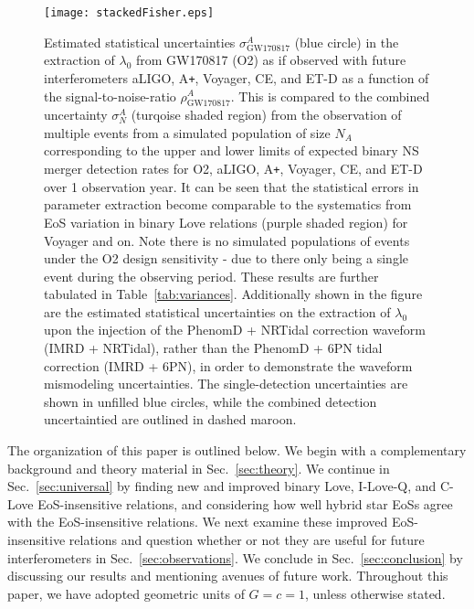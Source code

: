 \documentclass[prd,twocolumn,nofootinbib,superscriptaddress,amsmath,amssymb]{revtex4-1}
\begin{document}
\begin{figure}
\begin{center} 
\texttt{[image: stackedFisher.eps]}
\end{center}
\caption{
Estimated statistical uncertainties $\sigma^A_{\text{GW170817}}$ (blue circle) in the extraction of $\lambda_0$ from GW170817 (O2) as if observed with future interferometers aLIGO, A\texttt{+}, Voyager, CE, and ET-D as a function of the signal-to-noise-ratio $\rho^A_{\text{GW170817}}$.
This is compared to the combined uncertainty $\sigma^A_N$ (turqoise shaded region) from the observation of multiple events from a simulated population of size $N_A$ corresponding to the upper and lower limits of expected binary NS merger detection rates for O2, aLIGO, A\texttt{+}, Voyager, CE, and ET-D over 1 observation year.
It can be seen that the statistical errors in parameter extraction become comparable to the systematics from EoS variation in binary Love relations (purple shaded region) for Voyager and on.
Note there is no simulated populations of events under the O2 design sensitivity - due to there only being a single event during the observing period.
These results are further tabulated in Table~\ref{tab:variances}.
Additionally shown in the figure are the estimated statistical uncertainties on the extraction of $\lambda_0$ upon the injection of the PhenomD + NRTidal correction waveform (IMRD + NRTidal), rather than the PhenomD + 6PN tidal correction (IMRD + 6PN), in order to demonstrate the waveform mismodeling uncertainties.
The single-detection uncertainties are shown in unfilled blue circles, while the combined detection uncertaintied are outlined in dashed maroon.
}
\label{fig:stackedFisher}
\end{figure} 

The organization of this paper is outlined below.
We begin with a complementary background and theory material in Sec.~\ref{sec:theory}.
We continue in Sec.~\ref{sec:universal} by finding new and improved binary Love, I-Love-Q, and C-Love EoS-insensitive relations, and considering how well hybrid star EoSs agree with the EoS-insensitive relations.
We next examine these improved EoS-insensitive relations and question whether or not they are useful for future interferometers in Sec.~\ref{sec:observations}.
We conclude in Sec.~\ref{sec:conclusion} by discussing our results and mentioning avenues of future work.
Throughout this paper, we have adopted geometric units of $G=c=1$, unless otherwise stated.

\end{document}
